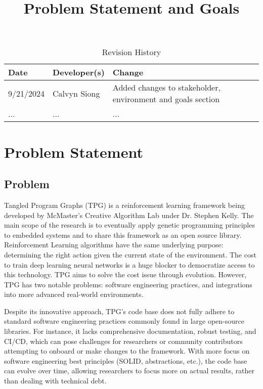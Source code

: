 \documentclass{article}
\title{Problem Statement and Goals\\\progname}
\author{\authname}
\date{}
\begin{document}
\maketitle

\begin{table}[hp]
\caption{Revision History} \label{TblRevisionHistory}
\begin{tabularx}{\textwidth}{llX}
\toprule
\textbf{Date} & \textbf{Developer(s)} & \textbf{Change}\\
\midrule
9/21/2024 & Calvyn Siong & Added changes to stakeholder, environment and goals section\\

... & ... & ...\\
\bottomrule
\end{tabularx}
\end{table}

\section{Problem Statement}

\subsection{Problem}

Tangled Program Graphs (TPG) is a reinforcement learning framework being developed by McMaster’s Creative Algorithm Lab under Dr. Stephen Kelly. The main scope of the research is to eventually apply genetic programming principles to embedded systems and to share this framework as an open source library. Reinforcement Learning algorithms have the same underlying purpose: determining the right action given the current state of the environment. The cost to train deep learning neural networks is a huge blocker to democratize access to this technology. TPG aims to solve the cost issue through evolution. However, TPG has two notable problems: software engineering practices, and integrations into more advanced real-world environments.

Despite its innovative approach, TPG’s code base does not fully adhere to standard software engineering practices commonly found in large open-source libraries. For instance, it lacks comprehensive documentation, robust testing, and CI/CD, which can pose challenges for researchers or community contributors attempting to onboard or make changes to the framework. With more focus on software engineering best principles (SOLID, abstractions, etc.), the code base can evolve over time, allowing researchers to focus more on actual results, rather than dealing with technical debt.
\end{document}
